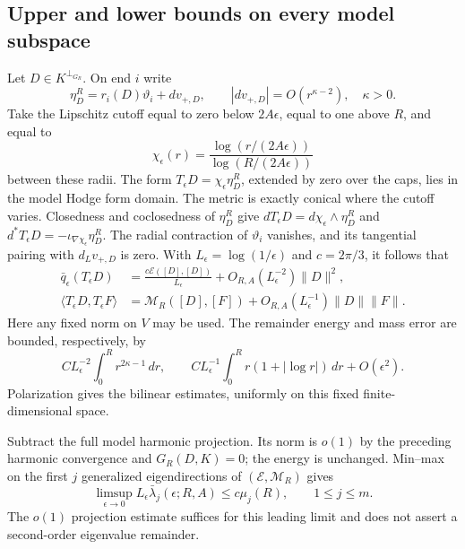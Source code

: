 \subsection{Upper and lower bounds on every model subspace}
Let $D\in K^{\perp_{G_R}}$. On end $i$ write
\[
 \eta_D^R=r_i(D)\vartheta_i+dv_{+,D},\qquad
 |dv_{+,D}|=O(r^{\kappa-2}),\quad \kappa>0.
\]
Take the Lipschitz cutoff equal to zero below $2A\epsilon$, equal to one
above $R$, and equal to
\[
 \chi_\epsilon(r)=
 \frac{\log(r/(2A\epsilon))}{\log(R/(2A\epsilon))}
\]
between these radii. The form $T_\epsilon D=\chi_\epsilon\eta_D^R$,
extended by zero over the caps, lies in the model Hodge form domain.
The metric is exactly conical where the cutoff varies. Closedness and
coclosedness of $\eta_D^R$ give
$dT_\epsilon D=d\chi_\epsilon\wedge\eta_D^R$ and
$d^*T_\epsilon D=-\iota_{\nabla\chi_\epsilon}\eta_D^R$.
The radial contraction of $\vartheta_i$ vanishes, and its tangential
pairing with $d_Lv_{+,D}$ is zero. With $L_\epsilon=\log(1/\epsilon)$
and $c=2\pi/3$, it follows that
\begin{align}
 \bar q_\epsilon(T_\epsilon D)
 &=\frac{c\mathcal E([D],[D])}{L_\epsilon}
       +O_{R,A}(L_\epsilon^{-2})\|D\|^2,
       \label{eq:matrix-trial-energy}\\
 \langle T_\epsilon D,T_\epsilon F\rangle
 &=\mathcal M_R([D],[F])+O_{R,A}(L_\epsilon^{-1})\|D\|\|F\|.
       \label{eq:matrix-trial-mass}
\end{align}
Here any fixed norm on $V$ may be used. The remainder energy and mass
error are bounded, respectively, by
\[
 CL_\epsilon^{-2}\int_0^R r^{2\kappa-1}\,dr,
 \qquad CL_\epsilon^{-1}\int_0^R r(1+|\log r|)\,dr+O(\epsilon^2).
\]
Polarization gives the bilinear estimates, uniformly on this fixed
finite-dimensional space.

Subtract the full model harmonic projection. Its norm is $o(1)$ by the
preceding harmonic convergence and $G_R(D,K)=0$; the energy is unchanged.
Min--max on the first $j$ generalized eigendirections of $(\mathcal E,\mathcal M_R)$ gives
\begin{equation}\label{eq:matrix-upper}
 \limsup_{\epsilon\to0}L_\epsilon\bar\lambda_j(\epsilon;R,A)
 \le c\mu_j(R),\qquad 1\le j\le m.
\end{equation}
The $o(1)$ projection estimate suffices for this leading limit and does
not assert a second-order eigenvalue remainder.

